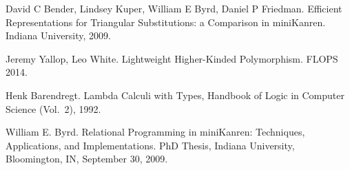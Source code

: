 \documentclass[submission,copyright,creativecommons]{eptcs}
\begin{document}
\begin{thebibliography}{99}
David C Bender, Lindsey Kuper, William E Byrd, Daniel P Friedman. 
Efficient Representations for Triangular Substitutions: a Comparison in miniKanren. Indiana University, 2009.

Jeremy Yallop, Leo White. Lightweight Higher-Kinded Polymorphism. FLOPS 2014.

Henk Barendregt. Lambda Calculi with Types, Handbook of Logic in Computer Science (Vol.~2), 1992.

William E. Byrd. Relational Programming in miniKanren: Techniques, Applications, and Implementations. PhD Thesis,
Indiana University, Bloomington, IN, September 30, 2009.
\end{thebibliography}
\end{document}
